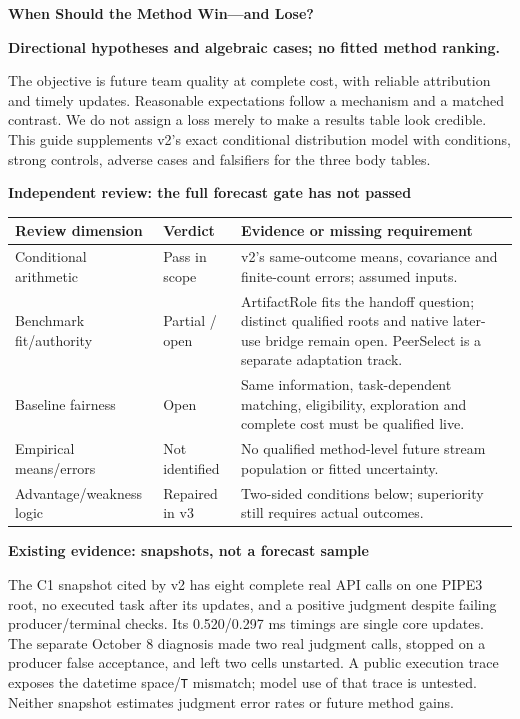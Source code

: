 \documentclass[10pt,a4paper]{article}
\newcommand{\lead}[1]{\vspace{4pt}\textbf{#1}\par}
\newcommand{\caution}{\textcolor{red!70!black}{\textbf{Directional hypotheses and algebraic cases; no fitted method ranking.}}\par}
\begin{document}
{\Large\bfseries When Should the Method Win---and Lose?}\par\caution
The objective is future team quality at complete cost, with reliable attribution
and timely updates. Reasonable expectations follow a mechanism and a matched
contrast. We do not assign a loss merely to make a results table look credible.
This guide supplements v2's exact conditional distribution model with conditions,
strong controls, adverse cases and falsifiers for the three body tables.

\lead{Independent review: the full forecast gate has not passed}
\begin{center}\small
\begin{tabularx}{\linewidth}{@{}L{.23\linewidth}L{.15\linewidth}X@{}}\toprule
Review dimension & Verdict & Evidence or missing requirement\\\midrule
Conditional arithmetic & Pass in scope & v2's same-outcome means, covariance and finite-count errors; assumed inputs.\\
Benchmark fit/authority & Partial / open & ArtifactRole fits the handoff question; distinct qualified roots and native later-use bridge remain open. PeerSelect is a separate adaptation track.\\
Baseline fairness & Open & Same information, task-dependent matching, eligibility, exploration and complete cost must be qualified live.\\
Empirical means/errors & Not identified & No qualified method-level future stream population or fitted uncertainty.\\
Advantage/weakness logic & Repaired in v3 & Two-sided conditions below; superiority still requires actual outcomes.\\\bottomrule
\end{tabularx}\end{center}

\lead{Existing evidence: snapshots, not a forecast sample}
The C1 snapshot cited by v2 has eight complete real API calls on one PIPE3 root,
no executed task after its updates, and a positive judgment despite failing
producer/terminal checks. Its 0.520/0.297 ms timings are single core updates.
The separate October 8 diagnosis made two real judgment calls, stopped on a
producer false acceptance, and left two cells unstarted. A public execution trace
exposes the datetime space/\texttt{T} mismatch; model use of that trace is untested.
Neither snapshot estimates judgment error rates or future method gains.
\end{document}

